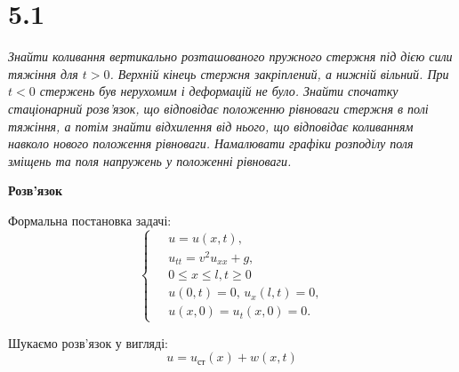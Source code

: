 


%


\section[Задача №5.1]{5.1}

\textit{Знайти коливання вертикально розташованого пружного стержня під дією сили тяжіння для $t > 0$. Верхній кінець стержня закріплений, а нижній вільний. При $t < 0$ стержень був нерухомим і деформацій не було. Знайти спочатку стаціонарний розв’язок, що відповідає положенню рівноваги стержня в полі тяжіння, а потім знайти відхилення від нього, що відповідає коливанням навколо нового положення рівноваги. Намалювати графіки розподілу поля зміщень та поля напружень у положенні рівноваги.}

\begin{center}
    \large{\textbf{Розв'язок}}
\end{center}

\noindent Формальна постановка задачі:
\begin{equation} \label{cond5,1}
    \left\{ \begin{aligned}
            \;&u = u(x,t), \\
            &u_{tt} = v^2 u_{xx} + g, \\
            &0 \leq x \leq l, t \geq 0 \\
            &u(0,t) = 0, \, u_x(l,t) = 0, \\
            &u(x,0) = u_t(x,0) = 0.
    \end{aligned} \right.
\end{equation}

Шукаємо розв'язок у вигляді:
\begin{equation}
    u = u_{\text{ст}}(x) + w(x,t)
\end{equation}

